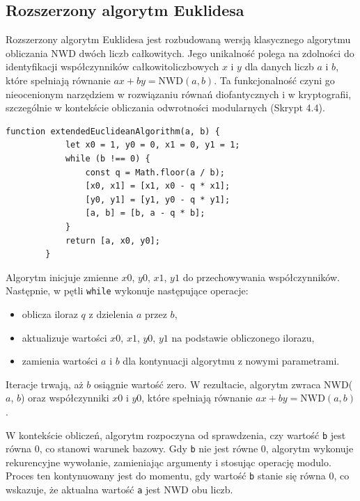 \documentclass{SGGW-thesis}
\begin{document}
	\subsection{Rozszerzony algorytm Euklidesa}
	Rozszerzony algorytm Euklidesa jest rozbudowaną wersją klasycznego algorytmu obliczania NWD dwóch liczb całkowitych. Jego unikalność polega na zdolności do identyfikacji współczynników całkowitoliczbowych \(x\) i \(y\) dla danych liczb \(a\) i \(b\), które spełniają równanie \(ax + by = \text{NWD}(a, b)\). Ta funkcjonalność czyni go nieocenionym narzędziem w rozwiązaniu równań diofantycznych i w kryptografii, szczególnie w kontekście obliczania odwrotności modularnych (Skrypt 4.4).
	\vspace{1em}
	\begin{lstlisting}[caption=Funkcja Rozszerzonego Algorytmu Euklidesa w JavaScript]
		function extendedEuclideanAlgorithm(a, b) {
			let x0 = 1, y0 = 0, x1 = 0, y1 = 1;
			while (b !== 0) {
				const q = Math.floor(a / b);
				[x0, x1] = [x1, x0 - q * x1];
				[y0, y1] = [y1, y0 - q * y1];
				[a, b] = [b, a - q * b];
			}
			return [a, x0, y0];
		}
	\end{lstlisting}
	\vspace{1em}
	Algorytm inicjuje zmienne \(x0\), \(y0\), \(x1\), \(y1\) do przechowywania współczynników. Następnie, w pętli \texttt{while} wykonuje następujące operacje:
	\begin{itemize}
		\item oblicza iloraz \(q\) z dzielenia \(a\) przez \(b\),
		\item aktualizuje wartości \(x0\), \(x1\), \(y0\), \(y1\) na podstawie obliczonego ilorazu,
		\item zamienia wartości \(a\) i \(b\) dla kontynuacji algorytmu z nowymi parametrami.
	\end{itemize}
	Iteracje trwają, aż \(b\) osiągnie wartość zero. W rezultacie, algorytm zwraca NWD(\(a\), \(b\)) oraz współczynniki \(x0\) i \(y0\), które spełniają równanie \(ax + by = \text{NWD}(a, b)\).
	
	\noindent W kontekście obliczeń, algorytm rozpoczyna od sprawdzenia, czy wartość \texttt{b} jest równa 0, co stanowi warunek bazowy. Gdy \texttt{b} nie jest równe 0, algorytm wykonuje rekurencyjne wywołanie, zamieniając argumenty i stosując operację modulo. Proces ten kontynuowany jest do momentu, gdy wartość \texttt{b} stanie się równa 0, co wskazuje, że aktualna wartość \texttt{a} jest NWD obu liczb.
	\newpage
	
\end{document}
